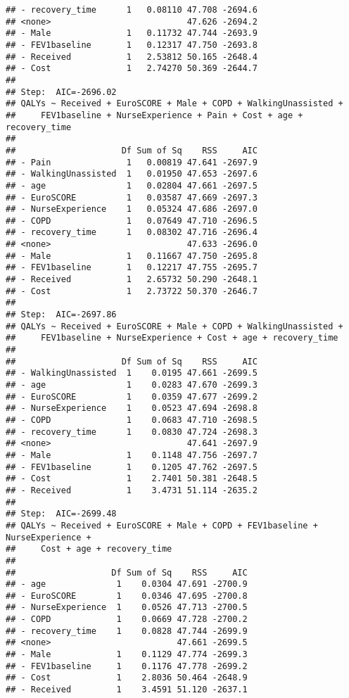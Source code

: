 \documentclass[
]{article}
\begin{document}
\begin{verbatim}
## - recovery_time      1   0.08110 47.708 -2694.6
## <none>                           47.626 -2694.2
## - Male               1   0.11732 47.744 -2693.9
## - FEV1baseline       1   0.12317 47.750 -2693.8
## - Received           1   2.53812 50.165 -2648.4
## - Cost               1   2.74270 50.369 -2644.7
## 
## Step:  AIC=-2696.02
## QALYs ~ Received + EuroSCORE + Male + COPD + WalkingUnassisted + 
##     FEV1baseline + NurseExperience + Pain + Cost + age + recovery_time
## 
##                     Df Sum of Sq    RSS     AIC
## - Pain               1   0.00819 47.641 -2697.9
## - WalkingUnassisted  1   0.01950 47.653 -2697.6
## - age                1   0.02804 47.661 -2697.5
## - EuroSCORE          1   0.03587 47.669 -2697.3
## - NurseExperience    1   0.05324 47.686 -2697.0
## - COPD               1   0.07649 47.710 -2696.5
## - recovery_time      1   0.08302 47.716 -2696.4
## <none>                           47.633 -2696.0
## - Male               1   0.11667 47.750 -2695.8
## - FEV1baseline       1   0.12217 47.755 -2695.7
## - Received           1   2.65732 50.290 -2648.1
## - Cost               1   2.73722 50.370 -2646.7
## 
## Step:  AIC=-2697.86
## QALYs ~ Received + EuroSCORE + Male + COPD + WalkingUnassisted + 
##     FEV1baseline + NurseExperience + Cost + age + recovery_time
## 
##                     Df Sum of Sq    RSS     AIC
## - WalkingUnassisted  1    0.0195 47.661 -2699.5
## - age                1    0.0283 47.670 -2699.3
## - EuroSCORE          1    0.0359 47.677 -2699.2
## - NurseExperience    1    0.0523 47.694 -2698.8
## - COPD               1    0.0683 47.710 -2698.5
## - recovery_time      1    0.0830 47.724 -2698.3
## <none>                           47.641 -2697.9
## - Male               1    0.1148 47.756 -2697.7
## - FEV1baseline       1    0.1205 47.762 -2697.5
## - Cost               1    2.7401 50.381 -2648.5
## - Received           1    3.4731 51.114 -2635.2
## 
## Step:  AIC=-2699.48
## QALYs ~ Received + EuroSCORE + Male + COPD + FEV1baseline + NurseExperience + 
##     Cost + age + recovery_time
## 
##                   Df Sum of Sq    RSS     AIC
## - age              1    0.0304 47.691 -2700.9
## - EuroSCORE        1    0.0346 47.695 -2700.8
## - NurseExperience  1    0.0526 47.713 -2700.5
## - COPD             1    0.0669 47.728 -2700.2
## - recovery_time    1    0.0828 47.744 -2699.9
## <none>                         47.661 -2699.5
## - Male             1    0.1129 47.774 -2699.3
## - FEV1baseline     1    0.1176 47.778 -2699.2
## - Cost             1    2.8036 50.464 -2648.9
## - Received         1    3.4591 51.120 -2637.1

\end{verbatim}
\end{document}
